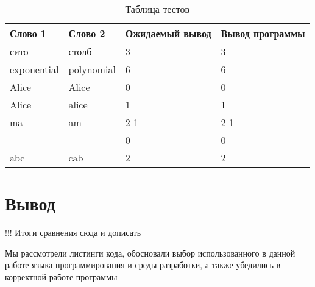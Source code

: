 \begin{table}[h]
	\caption{Таблица тестов}
	\centering
	\begin{tabular}{ | l | l | l | l |}
		\hline
		Слово 1 & Слово 2 & Ожидаемый вывод &  Вывод программы  \\ \hline
		сито & столб & 3 & 3 \\ \hline
		exponential & polynomial & 6 & 6 \\ \hline
		Alice & Alice & 0 & 0 \\ \hline
		Alice & alice & 1 & 1 \\ \hline
		ma  & am & 2 1 &  2 1 \\ \hline
		& & 0 & 0 \\ \hline
		abc & cab & 2 & 2 \\ \hline
		\hline
	\end{tabular}
	\label{table:satellites}
\end{table} 


\section{Вывод}

!!! Итоги сравнения сюда и дописать

Мы рассмотрели листинги кода, обосновали выбор использованного в данной работе языка программирования и среды разработки, а также убедились в корректной работе программы



